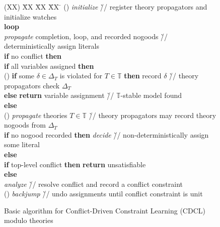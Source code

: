 \begin{figure}[t]
  \setcounter{cddl}{8}
  \renewcommand{\thecddl}{\Alph{cddl}}
  \begin{tabbing}
   (XX)  \= XX \= XX \= XX \= \kill%
   (\thecddl)\label{fig:cdcl:init}
         \> \textit{initialize} \` // register theory propagators and initialize watches \\
         \> \textbf{loop} \\
         \> \> \textit{propagate} completion, loop, and recorded nogoods
               \` // deterministically assign literals \\
         \> \> \textbf{if} no conflict \textbf{then} \\
         \> \> \> \textbf{if} all variables assigned \textbf{then} \\
   \setcounter{cddl}{2}%
   (\thecddl)\label{fig:cdcl:check}
         \> \> \> \> \textbf{if} some $\delta\in\Delta_T$ is violated for   $T\in\mathbb{T}$ \textbf{then} record $\delta$
                     \` // theory propagators check $\Delta_T$ \\
         \> \> \> \> \textbf{else} \textbf{return} variable assignment
                   \`// $\mathbb{T}$-stable model found \\
         \> \> \> \textbf{else} \\
   \setcounter{cddl}{15}%
   (\thecddl)\label{fig:cdcl:propagate}
         \> \> \> \> \textit{propagate} theories $T\in\mathbb{T}$
                     \`// theory propagators may record theory nogoods from $\Delta_T$ \\
         \> \> \> \> \textbf{if} no nogood recorded \textbf{then} \textit{decide}
                     \`// non-deterministically assign some literal \\
         \> \> \textbf{else} \\
         \> \> \> \textbf{if} top-level conflict \textbf{then} \textbf{return} unsatisfiable \\
         \> \> \> \textbf{else} \\
         \> \> \> \> \textit{analyze} \`// resolve conflict and record a conflict constraint \\
   \setcounter{cddl}{20}%
   (\thecddl)\label{fig:cdcl:undo}
         \> \> \> \> \textit{backjump} \`// undo assignments until conflict constraint is unit
 \end{tabbing}
\caption{Basic algorithm for Conflict-Driven %
         Constraint Learning (CDCL)
         modulo theories}
\label{fig:cdcl}
\end{figure}%
